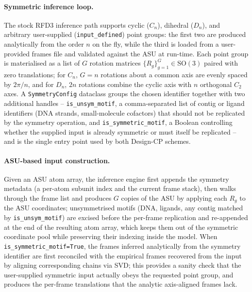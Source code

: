 \documentclass{article}
\theoremstyle{plain}
\theoremstyle{definition}
\theoremstyle{remark}
\begin{document}
\paragraph{Symmetric inference loop.} The stock RFD3 inference path supports cyclic ($C_n$), dihedral ($D_n$), and arbitrary user-supplied (\texttt{input\_defined}) point groups: the first two are produced analytically from the order $n$ on the fly, while the third is loaded from a user-provided frames file and validated against the ASU at run-time. Each point group is materialised as a list of $G$ rotation matrices $\{R_g\}_{g=1}^{G}\in\mathrm{SO}(3)$ paired with zero translations; for $C_n$, $G=n$ rotations about a common axis are evenly spaced by $2\pi/n$, and for $D_n$, $2n$ rotations combine the cyclic axis with $n$ orthogonal $C_2$ axes. A \texttt{SymmetryConfig} dataclass groups the chosen identifier together with two additional handles -- \texttt{is\_unsym\_motif}, a comma-separated list of contig or ligand identifiers (DNA strands, small-molecule cofactors) that should not be replicated by the symmetry operation, and \texttt{is\_symmetric\_motif}, a Boolean controlling whether the supplied input is already symmetric or must itself be replicated -- and is the single entry point used by both Design-CP schemes.

\paragraph{ASU-based input construction.} Given an ASU atom array, the inference engine first appends the symmetry metadata (a per-atom subunit index and the current frame stack), then walks through the frame list and produces $G$ copies of the ASU by applying each $R_g$ to the ASU coordinates; unsymmetrised motifs (DNA, ligands, any contig matched by \texttt{is\_unsym\_motif}) are excised before the per-frame replication and re-appended at the end of the resulting atom array, which keeps them out of the symmetric coordinate pool while preserving their indexing inside the model. When \texttt{is\_symmetric\_motif=True}, the frames inferred analytically from the symmetry identifier are first reconciled with the empirical frames recovered from the input by aligning corresponding chains via SVD; this provides a sanity check that the user-supplied symmetric input actually obeys the requested point group, and produces the per-frame translations that the analytic axis-aligned frames lack.
\end{document}

